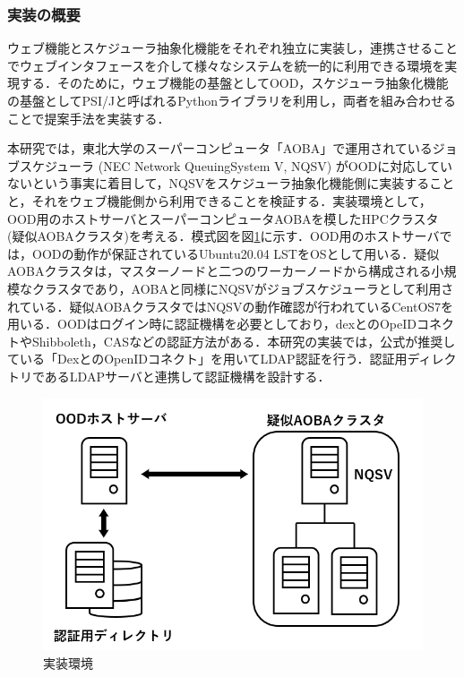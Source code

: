 \subsubsection{実装の概要}
ウェブ機能とスケジューラ抽象化機能をそれぞれ独立に実装し，連携させることでウェブインタフェースを介して様々なシステムを統一的に利用できる環境を実現する．そのために，ウェブ機能の基盤としてOOD，スケジューラ抽象化機能の基盤としてPSI/J\cite{cite5}と呼ばれるPythonライブラリを利用し，両者を組み合わせることで提案手法を実装する．\par
本研究では，東北大学のスーパーコンピュータ「AOBA」で運用されているジョブスケジューラ (NEC Network QueuingSystem V, NQSV) \cite{nqsv_scheduler}がOODに対応していないという事実に着目して，NQSVをスケジューラ抽象化機能側に実装することと，それをウェブ機能側から利用できることを検証する．実装環境として，OOD用のホストサーバとスーパーコンピュータAOBAを模したHPCクラスタ (疑似AOBAクラスタ)を考える．模式図を図\ref{fig7}に示す．OOD用のホストサーバでは，OODの動作が保証されているUbuntu20.04 LSTをOSとして用いる．疑似AOBAクラスタは，マスターノードと二つのワーカーノードから構成される小規模なクラスタであり，AOBAと同様にNQSVがジョブスケジューラとして利用されている．疑似AOBAクラスタではNQSVの動作確認が行われているCentOS7を用いる\cite{nqsv_introduction}．OODはログイン時に認証機構を必要としており，dexとのOpeIDコネクト\cite{dex}\cite{openidconnect}やShibboleth\cite{shibboleth}，CAS\cite{CAS}などの認証方法がある．本研究の実装では，公式が推奨している「DexとのOpenIDコネクト」を用いてLDAP認証を行う\cite{cite7}\cite{cite8}．認証用ディレクトリであるLDAPサーバと連携して認証機構を設計する．\par

\begin{figure}[tb]
    \centering
    \includegraphics[width=120mm]{./fig/environment.png}
    \caption{実装環境}
    \label{fig7}
\end{figure}


